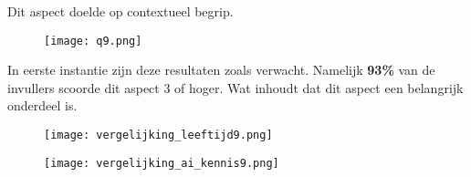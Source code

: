 Dit aspect doelde op contextueel begrip.

\begin{figure}[htbp]
    \centering
    \texttt{[image: q9.png]}
    \label{fig:vraag_9_resultaat}
\end{figure}

In eerste instantie zijn deze resultaten zoals verwacht. Namelijk \textbf{93\%} van de invullers scoorde dit aspect 3 of hoger. Wat inhoudt dat dit aspect een belangrijk onderdeel is.

\begin{figure}[htbp]
    \centering
    \texttt{[image: vergelijking\_leeftijd9.png]}
    \label{fig:vergelijking_leeftijd9}
\end{figure}

\begin{figure}[htbp]
    \centering
    \texttt{[image: vergelijking\_ai\_kennis9.png]}
    \label{fig:vergelijking_ai_kennis9}
\end{figure}